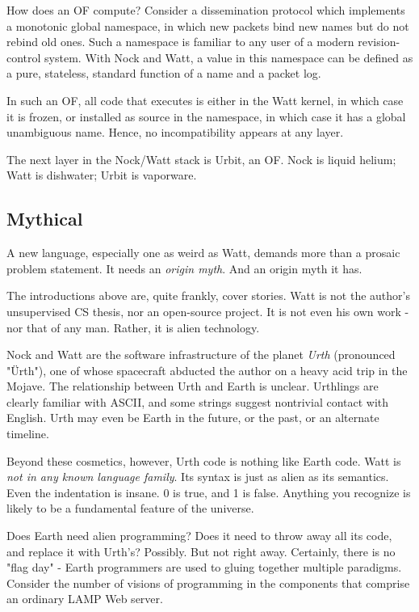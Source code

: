 \documentclass[10pt, nocopyrightspace]{sigplanconf}
\begin{document}
How does an OF compute?  Consider a dissemination protocol which
implements a monotonic global namespace, in which new packets
bind new names but do not rebind old ones.  Such a namespace is
familiar to any user of a modern revision-control system.  With
Nock and Watt, a value in this namespace can be defined as a
pure, stateless, standard function of a name and a packet log.

In such an OF, all code that executes is either in the Watt
kernel, in which case it is frozen, or installed as source in the
namespace, in which case it has a global unambiguous name.
Hence, no incompatibility appears at any layer.

The next layer in the Nock/Watt stack is Urbit, an OF.  Nock is
liquid helium; Watt is dishwater; Urbit is vaporware.

\subsection{Mythical}

A new language, especially one as weird as Watt, demands more
than a prosaic problem statement.  It needs an \emph{origin myth}.  And
an origin myth it has.

The introductions above are, quite frankly, cover stories.  Watt
is not the author's unsupervised CS thesis, nor an open-source
project.  It is not even his own work - nor that of any man.
Rather, it is alien technology.

Nock and Watt are the software infrastructure of the planet
\emph{Urth}
(pronounced "\"Urth"), one of whose spacecraft abducted the author
on a heavy acid trip in the Mojave.  The relationship between
Urth and Earth is unclear.  Urthlings are clearly familiar with
ASCII, and some strings suggest nontrivial contact with English.
Urth may even be Earth in the future, or the past, or an
alternate timeline.

Beyond these cosmetics, however, Urth code is nothing like Earth
code.  Watt is \emph{not in any known language family}.  Its syntax is
just as alien as its semantics.  Even the indentation is insane.
0 is true, and 1 is false.  Anything you recognize is likely to
be a fundamental feature of the universe.

Does Earth need alien programming?  Does it need to throw away
all its code, and replace it with Urth's?  Possibly.  But not
right away.  Certainly, there is no "flag day" - Earth
programmers are used to gluing together multiple paradigms.
Consider the number of visions of programming in the components
that comprise an ordinary LAMP Web server.
\end{document}
